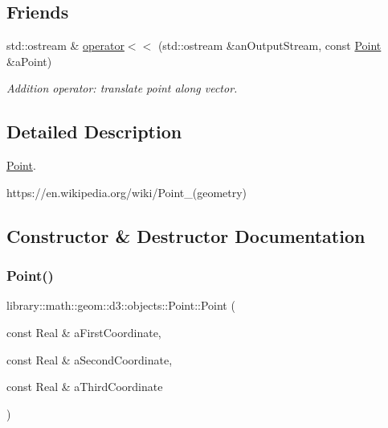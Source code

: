 \subsection*{Friends}
\begin{DoxyCompactItemize}
\item 
std\+::ostream \& \hyperlink{classlibrary_1_1math_1_1geom_1_1d3_1_1objects_1_1_point_ac6c8450721254f3cefdea7dcdd5f5001}{operator$<$$<$} (std\+::ostream \&an\+Output\+Stream, const \hyperlink{classlibrary_1_1math_1_1geom_1_1d3_1_1objects_1_1_point}{Point} \&a\+Point)
\begin{DoxyCompactList}\small\item\em Addition operator\+: translate point along vector. \end{DoxyCompactList}\end{DoxyCompactItemize}


\subsection{Detailed Description}
\hyperlink{classlibrary_1_1math_1_1geom_1_1d3_1_1objects_1_1_point}{Point}. 

https\+://en.wikipedia.\+org/wiki/\+Point\+\_\+(geometry) 

\subsection{Constructor \& Destructor Documentation}
\mbox{\label{classlibrary_1_1math_1_1geom_1_1d3_1_1objects_1_1_point_a617e690ab6091af3de729cee337e309e}} 
\subsubsection{\texorpdfstring{Point()}{Point()}\hspace{0.1cm}{\footnotesize\ttfamily [1/2]}}
{\footnotesize\ttfamily library\+::math\+::geom\+::d3\+::objects\+::\+Point\+::\+Point (\begin{DoxyParamCaption}\item[{const Real \&}]{a\+First\+Coordinate,  }\item[{const Real \&}]{a\+Second\+Coordinate,  }\item[{const Real \&}]{a\+Third\+Coordinate }\end{DoxyParamCaption})}



